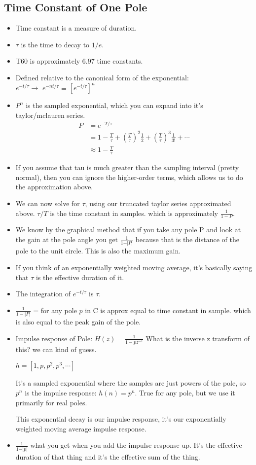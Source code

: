 \subsection*{Time Constant of One Pole}
\begin{itemize}
\item{Time constant is a measure of duration.}
\item{
$\tau$ is the time to decay to $1/e$. 
}
\item{
T60 is approximately 6.97 time constants.
}
\item{Defined relative to the canonical form of the exponential: \\
$e^{-t/\tau} \rightarrow $ 
$e^{-nt/\tau}$  =
$[e^{-t/\tau}]^n$ 

}
\item{
$P^n$ is the sampled exponential, which you can expand into it's
taylor/mclauren series. 
\begin{align*}
P &= e^{-T/\tau} \\
&= 1- \frac{T}{\tau} + 
(\frac{T}{\tau})^2 \frac{1}{2} + 
(\frac{T}{\tau})^3 \frac{1}{3!} + \cdots \\
&\approx 1 - \frac{T}{\tau}
\end{align*}
}
\item{
If you assume that tau is much greater than the sampling interval (pretty normal),
then you can ignore the higher-order terms, which allows us to do the 
approximation above.
}
\item{
We can now solve for $\tau$, using our truncated taylor series approximated 
above. $\tau/T$ is the time constant in samples. which is approximately 
$\frac{1}{1 - P}$.
}
\item{
We know by the graphical method that if you take any pole P and look at 
the gain at the pole angle you get $\frac{1}{1 - \vert P \vert}$ because
that is the distance of the pole to the unit circle. This is also the maximum
gain. 
}
\item{
If you think of an exponentially weighted moving average, it's basically
saying that $\tau$ is the effective duration of it. 
}
\item{
The integration of $e^{-t/\tau}$ is $\tau$.
}
\item{
$
\frac{1}{1 - |P|}
$ 
= for any pole $p$ in C is approx equal to time constant in sample.
which is also equal to the peak gain of the pole.
}
\item{
Impulse response of Pole: $H(z) = \frac{1}{1 - pz^{-1}}$
What is the inverse z transform of this? we can kind of guess.

$h = [1, p, p^2, p^3, \cdots]$

It's a sampled exponential where the samples are just powers of the pole,
so $p^n$ is the impulse response: $h(n) = p^n$. True for any pole, but we use
it primarily for real poles.

This exponential decay is our impulse response, it's our exponentially 
weighted moving average impulse response.
}
\item{
$\frac{1}{1 - \vert p \vert}$ what you get when you add the impulse response 
up. It's the effective duration of that thing and it's the effective sum of the
thing.
}
\end{itemize}


